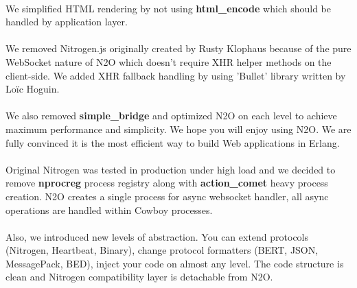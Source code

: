 \paragraph{}
We simplified HTML rendering by not using
{\bf html\_encode} which should be handled by application layer.

\paragraph{}
We removed Nitrogen.js originally created by Rusty Klophaus
because of the pure WebSocket nature of N2O which doesn't
require XHR helper methods on the client-side. We added XHR fallback
handling by using 'Bullet' library written by Loïc Hoguin.

\paragraph{}
We also removed {\bf simple\_bridge} and optimized N2O on each level to
achieve maximum performance and simplicity. We hope you will enjoy
using N2O. We are fully convinced it is the most efficient way to
build Web applications in Erlang.

\paragraph{}
Original Nitrogen was tested in production under high load and we
decided to remove {\bf nprocreg} process registry along 
with {\bf{action\_comet}} heavy process creation. N2O creates a single
process for async websocket handler, all async operations
are handled within Cowboy processes.

\paragraph{}
Also, we introduced new levels of abstraction. You can extend
protocols (Nitrogen, Heartbeat, Binary), change protocol formatters (BERT,
JSON, MessagePack, BED), inject your code on almost any level. The code structure
is clean and Nitrogen compatibility layer is detachable from N2O.
